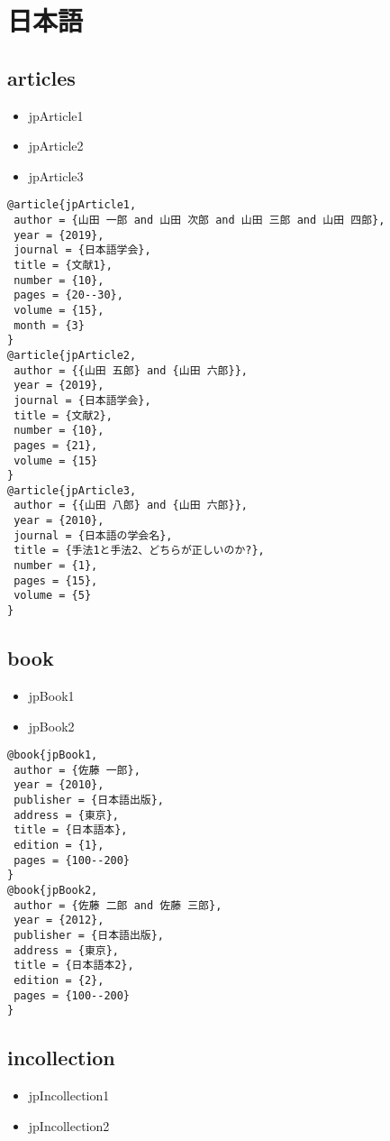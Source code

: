 \documentclass[9pt, twocolumn, a4paper]{jsarticle}
\begin{document}
\section{日本語}
\begin{bibunit}[jIEEEtran]

\subsection{articles}
\begin{itemize}
  \item jpArticle1 \cite{jpArticle1}
  \item jpArticle2 \cite{jpArticle2}
  \item jpArticle3 \cite{jpArticle3}
\end{itemize}

\begin{lstlisting}
@article{jpArticle1,
 author = {山田 一郎 and 山田 次郎 and 山田 三郎 and 山田 四郎},
 year = {2019},
 journal = {日本語学会},
 title = {文献1},
 number = {10},
 pages = {20--30},
 volume = {15},
 month = {3}
}
@article{jpArticle2,
 author = {{山田 五郎} and {山田 六郎}},
 year = {2019},
 journal = {日本語学会},
 title = {文献2},
 number = {10},
 pages = {21},
 volume = {15}
}
@article{jpArticle3,
 author = {{山田 八郎} and {山田 六郎}},
 year = {2010},
 journal = {日本語の学会名},
 title = {手法1と手法2、どちらが正しいのか?},
 number = {1},
 pages = {15},
 volume = {5}
}
\end{lstlisting}



\subsection{book}
\begin{itemize}
  \item jpBook1 \cite{jpBook1}
  \item jpBook2 \cite{jpBook2}
\end{itemize}

\begin{lstlisting}
@book{jpBook1,
 author = {佐藤 一郎},
 year = {2010},
 publisher = {日本語出版},
 address = {東京},
 title = {日本語本},
 edition = {1},
 pages = {100--200}
}
@book{jpBook2,
 author = {佐藤 二郎 and 佐藤 三郎},
 year = {2012},
 publisher = {日本語出版},
 address = {東京},
 title = {日本語本2},
 edition = {2},
 pages = {100--200}
}
\end{lstlisting}

\subsection{incollection}
\begin{itemize}
  \item jpIncollection1 \cite{jpIncollection1}
  \item jpIncollection2 \cite{jpIncollection2}
\end{itemize}


\end{bibunit}
\end{document}
